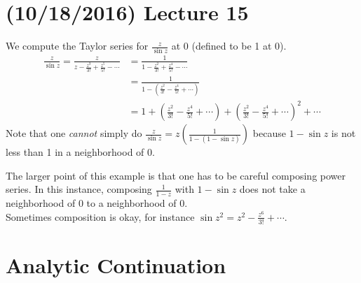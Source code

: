 \documentclass[11pt,leqno,oneside]{amsart}
\numberwithin{thm}{section}
\begin{document}
  \section{(10/18/2016) Lecture 15}
  \begin{example}
    We compute the Taylor series for $\frac{z}{\sin z}$ at 0 (defined
    to be 1 at 0).
    \begin{align*}
      \frac{z}{\sin z} =
      \frac{z}{z-\frac{z^3}{3!}+\frac{z^5}{5!}-\cdots} & =
                                                         \frac{1}{1-\frac{z^2}{3!}+\frac{z^4}{5!}-\cdots}
      \\
      \ & = \frac{1}{1-(\frac{z^2}{3!}-\frac{z^4}{5!}+\cdots)} \\
      \ & = 1 + (\frac{z^2}{3!} - \frac{z^4}{5!} + \cdots) +
          (\frac{z^2}{3!} - \frac{z^4}{5!} + \cdots)^2 + \cdots
    \end{align*}
    Note that one \emph{cannot} simply do $\frac{z}{\sin z} =
    z(\frac{1}{1-(1-\sin z)})$ because $1-\sin z$ is not less than 1
    in a neighborhood of 0.
  \end{example}
  The larger point of this example is that one has to be careful
  composing power series. In this instance, composing $\frac{1}{1-z}$
  with $1-\sin z$ does not take a neighborhood of 0 to a neighborhood
  of 0. \\

  Sometimes composition is okay, for instance $\sin z^2 = z^2 -
  \frac{z^6}{3!} + \cdots$.

  \section*{Analytic Continuation}
\end{document}
